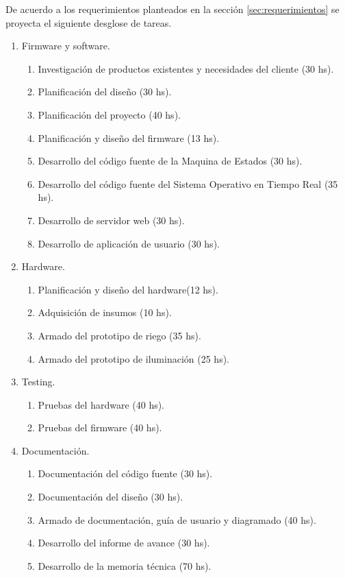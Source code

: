 \documentclass[
11pt, %
]{charter}
\begin{document}
De acuerdo a los requerimientos planteados en la sección \ref{sec:requerimientos} se proyecta el siguiente desglose de tareas.
\begin{enumerate}
\item Firmware y software.
	\begin{enumerate}
	\item Investigación de productos existentes y necesidades del cliente (30 hs).
	\item Planificación del diseño (30 hs).
	\item Planificación del proyecto (40 hs).
	\item Planificación y diseño del firmware (13 hs).
	\item Desarrollo del código fuente de la Maquina de Estados (30 hs).
	\item Desarrollo del código fuente del Sistema Operativo en Tiempo Real (35 hs).
	\item Desarrollo de servidor web (30 hs).
	\item Desarrollo de aplicación de usuario (30 hs).
	\end{enumerate}
\item Hardware.
	\begin{enumerate}
	\item Planificación y diseño del hardware(12 hs).
	\item Adquisición de insumos (10 hs).
	\item Armado del prototipo de riego (35 hs).
	\item Armado del prototipo de iluminación (25 hs).
	\end{enumerate}
\item Testing.
	\begin{enumerate}
	\item Pruebas del hardware (40 hs).
	\item Pruebas del firmware (40 hs).
	\end{enumerate}
\item Documentación.
	\begin{enumerate}
	\item Documentación del código fuente (30 hs).
	\item Documentación del diseño (30 hs).
	\item Armado de documentación, guía de usuario y diagramado (40 hs).
	\item Desarrollo del informe de avance (30 hs).
	\item Desarrollo de la memoria técnica (70 hs).
	\end{enumerate}
\end{enumerate}
\end{document}
